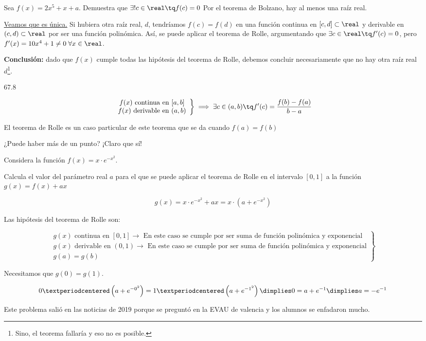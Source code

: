\begin{problem}
Sea $f(x) = 2x^5+x+a$.  Demuestra que $\exists!c\in\real\tq f(c)=0$
\solution
Por el teorema de Bolzano, hay al menos una raíz real.

\ul{Veamos que es única.} Si hubiera otra raíz real, $d$, tendríamos $f(c) = f(d)$ en una función continua en $[c,d]\subset\real$ y derivable en $(c,d)\subset\real$ por ser una función polinómica.
%
Así, se puede aplicar el teorema de Rolle, argumentando que $\exists c\in\real\tq f'(c) = 0$, pero $f'(x) = 10x^4+1 \neq 0 \;\forall x\in\real$.

\textbf{Conclusión: } dado que $f(x)$ cumple todas las hipótesis del teorema de Rolle, debemos concluir necesariamente que no hay otra raíz real $d$\footnote{Sino, el teorema fallaría y eso no es posible.}. 
\end{problem}

\begin{problem}
67.8
\solution
\end{problem}

\begin{theorem}
\[
\left.
	\begin{array}{c}
		f(x)\text{ continua en } [a,b]\\
		f(x)\text{ derivable en } (a,b)\\
	\end{array}
\right\}\implies \exists c\in(a,b)\tq f'(c)=\frac{f(b)-f(a)}{b-a}
\]

\obs El teorema de Rolle es un caso particular de este teorema que se da cuando $f(a) = f(b)$
\end{theorem}
\obs ¿Puede haber más de un punto? ¡Claro que sí!

\begin{problem}
Considera la función $f(x) = x·e^{-x^2}$.

Calcula el valor del parámetro real $a$ para el que se puede aplicar el teorema de Rolle en el intervalo $[0,1]$ a la función $g(x) = f(x) + ax$
\solution

\[g(x) = x·e^{-x^2} + ax = x·\left(a+e^{-x^2}\right)\]

Las hipótesis del teorema de Rolle son:

\[
\left.
	\begin{array}{l}
		g(x)\text{ continua en } [0,1] \to \text{ En este caso se cumple por ser suma de función polinómica y exponencial}\\
		g(x)\text{ derivable en } (0,1) \to \text{ En este caso se cumple por ser suma de función polinómica y exponencial}\\
		g(a)=g(b) 
	\end{array}
\right\}
\]

Necesitamos que $g(0) = g(1)$. 

\[0·\left(a+e^{-0^2}\right) = 1·\left(a+e^{-1^2}\right) \dimplies 0 = a+e^{-1} \dimplies a=-e^{-1}\]

\obs Este problema salió en las noticias de 2019 porque se preguntó en la EVAU de valencia y los alumnos se enfadaron mucho.
\end{problem}

